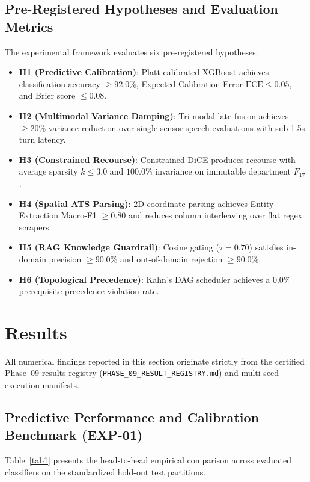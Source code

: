 \documentclass[conference]{IEEEtran}
\begin{document}
\subsection{Pre-Registered Hypotheses and Evaluation Metrics}
The experimental framework evaluates six pre-registered hypotheses:
\begin{itemize}
\item \textbf{H1 (Predictive Calibration)}: Platt-calibrated XGBoost achieves classification accuracy $\ge 92.0\%$, Expected Calibration Error $\text{ECE} \le 0.05$, and Brier score $\le 0.08$.
\item \textbf{H2 (Multimodal Variance Damping)}: Tri-modal late fusion achieves $\ge 20\%$ variance reduction over single-sensor speech evaluations with sub-1.5s turn latency.
\item \textbf{H3 (Constrained Recourse)}: Constrained DiCE produces recourse with average sparsity $k \le 3.0$ and $100.0\%$ invariance on immutable department $F_{17}$.
\item \textbf{H4 (Spatial ATS Parsing)}: 2D coordinate parsing achieves Entity Extraction Macro-F1 $\ge 0.80$ and reduces column interleaving over flat regex scrapers.
\item \textbf{H5 (RAG Knowledge Guardrail)}: Cosine gating ($\tau = 0.70$) satisfies in-domain precision $\ge 90.0\%$ and out-of-domain rejection $\ge 90.0\%$.
\item \textbf{H6 (Topological Precedence)}: Kahn's DAG scheduler achieves a $0.0\%$ prerequisite precedence violation rate.
\end{itemize}

\section{Results}

All numerical findings reported in this section originate strictly from the certified Phase~09 results registry (\texttt{PHASE\_09\_RESULT\_REGISTRY.md}) and multi-seed execution manifests.

\subsection{Predictive Performance and Calibration Benchmark (EXP-01)}

Table~\ref{tab1} presents the head-to-head empirical comparison across evaluated classifiers on the standardized hold-out test partitions.
\end{document}
